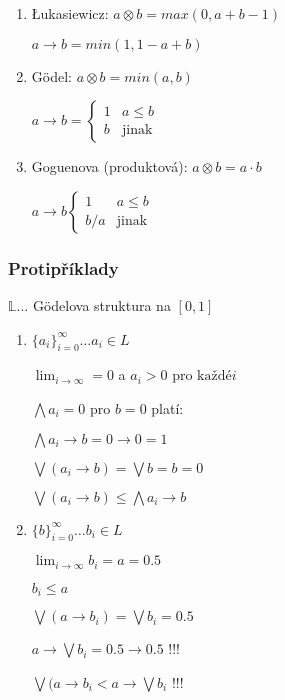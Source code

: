 \documentclass[10pt, a4paper, titlepage]{article}
\theoremstyle{note}
\begin{document}
\begin{enumerate}
\item{Łukasiewicz}: $a\otimes b = max(0, a+b-1)$

\hspace{5em} $a\rightarrow b = min(1, 1-a+b)$
\item{Gödel}: $a\otimes b = min(a, b)$

\hspace{3em} $a\rightarrow b = \begin{cases} 1 & a\leq b \\ 
b & \text{jinak} \end{cases} $
\item{Goguenova (produktová)}: $a\otimes b = a\cdot b$

  \hspace{5em} $a\rightarrow b \begin{cases} 1 & a\leq b \\ 
b/a & \text{jinak} \end{cases} $
\end{enumerate}

\subsubsection{Protipříklady}
$\mathbb{L}\dots$ Gödelova struktura na $[0, 1]$
\begin{enumerate}
\item $\{a_{i}\}_{i=0}^{\infty} \dots a_{i}\in L$

  $\lim_{i\to\infty} = 0$ a $a_{i} > 0 \text{ pro každé} i$

  $\bigwedge a_{i} = 0$ pro $b = 0$ platí:

  $\bigwedge a_{i} \rightarrow b = 0 \rightarrow 0 = 1$
  
  $\bigvee (a_{i} \rightarrow b) = \bigvee b = b = 0$

  $\bigvee (a_{i} \rightarrow b) \leq \bigwedge a_{i} \rightarrow b$

\item $\{b\}_{i=0}^{\infty}\dots b_{i}\in L$

  $\lim_{i\to\infty} b_{i} = a = 0.5$
  
  $b_{i} \leq a$

  $\bigvee(a\rightarrow b_{i}) = \bigvee b_{i} = 0.5$

  $a\rightarrow \bigvee b_{i} = 0.5 \rightarrow 0.5$ !!!

  $\bigvee(a\rightarrow b_{i} < a\rightarrow \bigvee b_{i}$ !!!
\end{enumerate}
\end{document}
